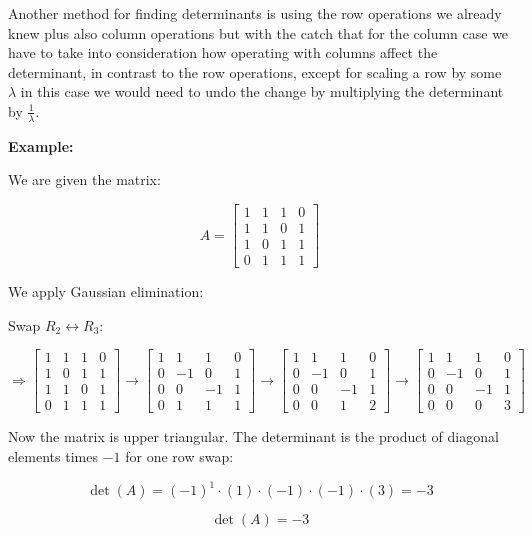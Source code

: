 Another method for finding determinants is using the row operations we already knew plus also column operations 
but with the catch that for the column case we have to take into consideration how
operating with columns affect the determinant, in contrast to the row operations, except for scaling
a row by some \(\lambda\) in this case we would need to undo the change by multiplying the determinant
by \(\frac{1}{\lambda}\).

\textbf{Example: }

We are given the matrix:

\[
A = \begin{bmatrix}
1 & 1 & 1 & 0 \\
1 & 1 & 0 & 1 \\
1 & 0 & 1 & 1 \\
0 & 1 & 1 & 1
\end{bmatrix}
\]

We apply Gaussian elimination:

Swap \( R_2 \leftrightarrow R_3 \):

\[
\Rightarrow
\begin{bmatrix}
1 & 1 & 1 & 0 \\
1 & 0 & 1 & 1 \\
1 & 1 & 0 & 1 \\
0 & 1 & 1 & 1
\end{bmatrix}
\rightarrow
\begin{bmatrix}
1 & 1 & 1 & 0 \\
0 & -1 & 0 & 1 \\
0 & 0 & -1 & 1 \\
0 & 1 & 1 & 1
\end{bmatrix}
\rightarrow
\begin{bmatrix}
1 & 1 & 1 & 0 \\
0 & -1 & 0 & 1 \\
0 & 0 & -1 & 1 \\
0 & 0 & 1 & 2
\end{bmatrix}
\rightarrow
\begin{bmatrix}
1 & 1 & 1 & 0 \\
0 & -1 & 0 & 1 \\
0 & 0 & -1 & 1 \\
0 & 0 & 0 & 3
\end{bmatrix}
\]

Now the matrix is upper triangular. The determinant is the product of diagonal elements times \( -1 \) for one row swap:

\[
\det(A) = {(-1)}^1 \cdot (1) \cdot (-1) \cdot (-1) \cdot (3) = -3
\]

\[\det(A) = -3\]

